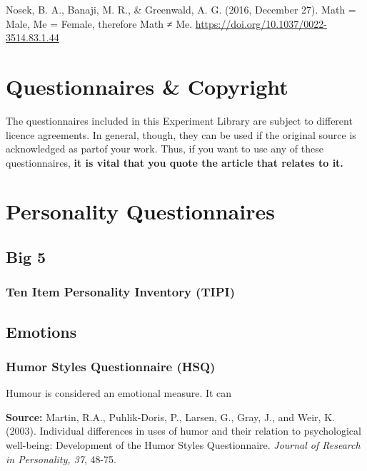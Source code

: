 \documentclass[
]{book}
\begin{document}
Nosek, B. A., Banaji, M. R., \& Greenwald, A. G. (2016, December 27). Math = Male, Me = Female, therefore Math ≠ Me. \url{https://doi.org/10.1037/0022-3514.83.1.44}

\hypertarget{questionnaires-copyright}{%
\chapter{Questionnaires \& Copyright}\label{questionnaires-copyright}}

The questionnaires included in this Experiment Library are subject to different licence agreements. In general, though, they can be used if the original source is acknowledged as partof your work. Thus, if you want to use any of these questionnaires, \textbf{it is vital that you quote the article that relates to it.}

\hypertarget{personality-questionnaires}{%
\chapter{Personality Questionnaires}\label{personality-questionnaires}}

\hypertarget{big-5}{%
\section{Big 5}\label{big-5}}

\hypertarget{ten-item-personality-inventory-tipi}{%
\subsection{Ten Item Personality Inventory (TIPI)}\label{ten-item-personality-inventory-tipi}}

\hypertarget{emotions}{%
\section{Emotions}\label{emotions}}

\hypertarget{humor-styles-questionnaire-hsq}{%
\subsection{Humor Styles Questionnaire (HSQ)}\label{humor-styles-questionnaire-hsq}}

Humour is considered an emotional measure. It can

\textbf{Source:}
Martin, R.A., Puhlik-Doris, P., Larsen, G., Gray, J., and Weir, K. (2003). Individual differences in uses of humor and their relation to psychological well-being: Development of the Humor Styles Questionnaire. \emph{Journal of Research in Personality, 37}, 48-75.
\end{document}
